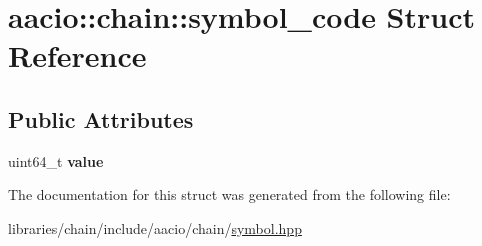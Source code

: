 \hypertarget{structaacio_1_1chain_1_1symbol__code}{}\section{aacio\+:\+:chain\+:\+:symbol\+\_\+code Struct Reference}
\label{structaacio_1_1chain_1_1symbol__code}
\subsection*{Public Attributes}
\begin{DoxyCompactItemize}
\item 
\mbox{\label{structaacio_1_1chain_1_1symbol__code_aa77e3fa8d9017b4b90946946a44bae52}} 
uint64\+\_\+t {\bfseries value}
\end{DoxyCompactItemize}


The documentation for this struct was generated from the following file\+:\begin{DoxyCompactItemize}
\item 
libraries/chain/include/aacio/chain/\mbox{\hyperlink{symbol_8hpp}{symbol.\+hpp}}\end{DoxyCompactItemize}
